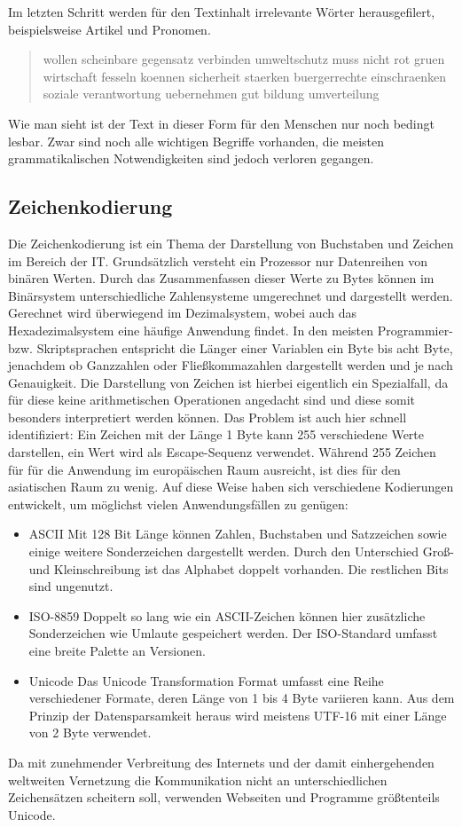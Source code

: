 Im letzten Schritt werden für den Textinhalt irrelevante Wörter herausgefilert, beispielsweise Artikel und Pronomen.
\newline
\begin{quote}
wollen scheinbare gegensatz verbinden umweltschutz muss nicht rot gruen wirtschaft fesseln koennen sicherheit staerken buergerrechte einschraenken soziale verantwortung uebernehmen gut bildung umverteilung
\end{quote}

Wie man sieht ist der Text in dieser Form für den Menschen nur noch bedingt lesbar. Zwar sind noch alle wichtigen Begriffe vorhanden, die meisten grammatikalischen Notwendigkeiten sind jedoch verloren gegangen.

\subsection{Zeichenkodierung}
Die Zeichenkodierung ist ein Thema der Darstellung von Buchstaben und Zeichen im Bereich der IT. Grundsätzlich versteht ein Prozessor nur Datenreihen von binären Werten. Durch das Zusammenfassen dieser Werte zu Bytes können im Binärsystem unterschiedliche Zahlensysteme umgerechnet und dargestellt werden. Gerechnet wird überwiegend im Dezimalsystem, wobei auch das Hexadezimalsystem eine häufige Anwendung findet. In den meisten Programmier- bzw. Skriptsprachen entspricht die Länger einer Variablen ein Byte bis acht Byte, jenachdem ob Ganzzahlen oder Fließkommazahlen dargestellt werden und je nach Genauigkeit. Die Darstellung von Zeichen ist hierbei eigentlich ein Spezialfall, da für diese keine arithmetischen Operationen angedacht sind und diese somit besonders interpretiert werden können. Das Problem ist auch hier schnell identifiziert: Ein Zeichen mit der Länge 1 Byte kann 255 verschiedene Werte darstellen, ein Wert wird als Escape-Sequenz verwendet. Während 255 Zeichen für für die Anwendung im europäischen Raum ausreicht, ist dies für den asiatischen Raum zu wenig. Auf diese Weise haben sich verschiedene Kodierungen entwickelt, um möglichst vielen Anwendungsfällen zu genügen:
\begin{itemize}
\item{ASCII} Mit 128 Bit Länge können Zahlen, Buchstaben und Satzzeichen sowie einige weitere Sonderzeichen dargestellt werden. Durch den Unterschied Groß- und Kleinschreibung ist das Alphabet doppelt vorhanden. Die restlichen Bits sind ungenutzt.
\item{ISO-8859} Doppelt so lang wie ein ASCII-Zeichen können hier zusätzliche Sonderzeichen wie Umlaute gespeichert werden. Der ISO-Standard umfasst eine breite Palette an Versionen.
\item{Unicode} Das Unicode Transformation Format umfasst eine Reihe verschiedener Formate, deren Länge von 1 bis 4 Byte variieren kann. Aus dem Prinzip der Datensparsamkeit heraus wird meistens UTF-16 mit einer Länge von 2 Byte verwendet.
\end{itemize}
Da mit zunehmender Verbreitung des Internets und der damit einhergehenden weltweiten Vernetzung die Kommunikation nicht an unterschiedlichen Zeichensätzen scheitern soll, verwenden Webseiten und Programme größtenteils Unicode. 

